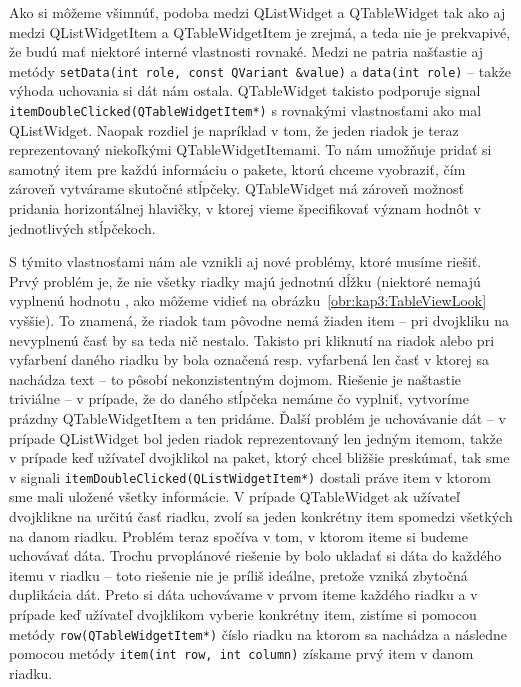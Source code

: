 Ako si môžeme všimnúť, podoba medzi QListWidget a QTableWidget tak ako aj medzi QListWidgetItem a QTableWidgetItem je zrejmá, a teda nie je prekvapivé, že budú mať niektoré interné vlastnosti rovnaké. Medzi ne patria našťastie aj metódy \texttt{setData(int role, const QVariant \&value)} a \texttt{data(int role)} -- takže výhoda uchovania si dát nám ostala. QTableWidget takisto podporuje signal  \texttt{itemDoubleClicked(QTableWidgetItem*)} s rovnakými vlastnosťami ako mal QListWidget. Naopak rozdiel je napríklad v tom, že jeden riadok je teraz reprezentovaný niekoľkými QTableWidgetItemami. To nám umožňuje pridať si samotný item pre každú informáciu o pakete, ktorú chceme vyobraziť, čím zároveň vytvárame skutočné stĺpčeky. QTableWidget má zároveň možnosť pridania horizontálnej hlavičky, v ktorej vieme špecifikovať význam hodnôt v jednotlivých stĺpčekoch.

S týmito vlastnosťami nám ale vznikli aj nové problémy, ktoré musíme riešiť. Prvý problém je, že nie všetky riadky majú jednotnú dĺžku (niektoré nemajú vyplnenú hodnotu , ako môžeme vidieť na obrázku~\ref{obr:kap3:TableViewLook} vyššie). To znamená, že riadok tam pôvodne nemá žiaden item -- pri dvojkliku na nevyplnenú časť by sa teda nič nestalo. Takisto pri kliknutí na riadok alebo pri vyfarbení daného riadku by bola označená resp. vyfarbená len časť v ktorej sa nachádza text -- to pôsobí nekonzistentným dojmom. Riešenie je naštastie triviálne -- v prípade, že do daného stĺpčeka nemáme čo vyplniť, vytvoríme prázdny QTableWidgetItem a ten pridáme. Ďalší problém je uchovávanie dát -- v prípade QListWidget bol jeden riadok reprezentovaný len jedným itemom, takže v prípade keď užívateľ dvojklikol na paket, ktorý chcel bližšie preskúmať, tak sme v signali \texttt{itemDoubleClicked(QListWidgetItem*)} dostali práve item v ktorom sme mali uložené všetky informácie. V prípade QTableWidget ak užívateľ dvojklikne na určitú časť riadku, zvolí sa jeden konkrétny item spomedzi všetkých na danom riadku. Problém teraz spočíva v tom, v ktorom iteme si budeme uchovávať dáta. Trochu prvoplánové riešenie by bolo ukladať si dáta do každého itemu v riadku -- toto riešenie nie je príliš ideálne, pretože vzniká zbytočná duplikácia dát. Preto si dáta uchovávame v prvom iteme každého riadku a v prípade keď užívateľ dvojklikom vyberie konkrétny item, zistíme si pomocou metódy \texttt{row(QTableWidgetItem*)} číslo riadku na ktorom sa nachádza a následne pomocou metódy \texttt{item(int row, int column)} získame prvý item v danom riadku.

